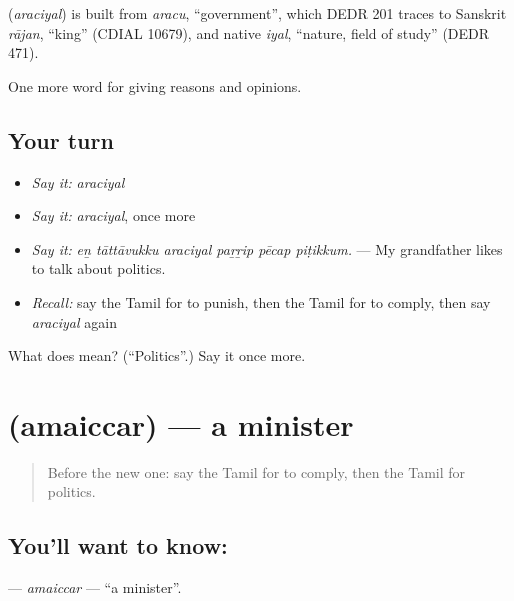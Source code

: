 \begin{cousinweb}
\textbf{} (\emph{araciyal}) is built from \emph{aracu}, \textquotedblleft{}government\textquotedblright{}, which DEDR 201 traces to Sanskrit \emph{rājan}, \textquotedblleft{}king\textquotedblright{} (CDIAL 10679), and native \emph{iyal}, \textquotedblleft{}nature, field of study\textquotedblright{} (DEDR 471).
\end{cousinweb}

\begin{grammarlens}[title={What you've built}]
One more word for giving reasons and opinions.
\end{grammarlens}

\subsection*{Your turn}
\begin{itemize}
\raggedright
  \item \emph{Say it:} \emph{araciyal}
  \item \emph{Say it:} \emph{araciyal}, once more
  \item \emph{Say it:} \emph{eṉ tāttāvukku araciyal paṟṟip pēcap piṭikkum.} — My grandfather likes to talk about politics.
  \item \emph{Recall:} say the Tamil for to punish, then the Tamil for to comply, then say \emph{araciyal} again
\end{itemize}

\begin{tcolorbox}[breakable,colback=teal!4,colframe=teal!35!black,title={Before you move on}]
What does  mean? (\textquotedblleft{}Politics\textquotedblright{}.) Say it once more.
\end{tcolorbox}
\section[\texorpdfstring{\ta{அமைச்சர்} (amaiccar)}{அமைச்சர் (amaiccar)}]{ (amaiccar) — a minister}

\label{lesson:TA-C373-amaiccar}



\begin{quote}
Before the new one: say the Tamil for to comply, then the Tamil for politics.
\end{quote}

\subsection*{You'll want to know: }
\textbf{} — \emph{amaiccar} — \textquotedblleft{}a minister\textquotedblright{}.

